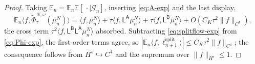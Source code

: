 \documentclass[a4paper,fleqn]{cas-sc}
\theoremstyle{definition}
\theoremstyle{remark}
\begin{document}
\begin{proof}
Taking $\mathbb E_n=\mathbb E_n\mathbb E[\,\cdot\mid\mathcal G_n]$, inserting \eqref{eq:A-exp}
and the last display,
\begin{equation}\label{eq:splitflow-exp}
\mathbb E_n\langle f,\widetilde\Phi^{N,\omega}_\tau(\mu^N_n)\rangle
=\langle f,\mu^N_n\rangle+\tau\langle f,\mathsf L^{\mathsf A}\mu^N_n\rangle
+\tau\langle f,\mathsf L^{\mathsf B}\mu^N_n\rangle+O(C_K\tau^2\|f\|_{C^4}),
\end{equation}
the cross term $\tau^2\langle f,\mathsf L^{\mathsf B}\mathsf L^{\mathsf A}\mu^N_n\rangle$
absorbed. Subtracting \eqref{eq:splitflow-exp} from \eqref{eq:Phi-exp}, the first-order
terms agree, so $|\mathbb E_n\langle f,\ell^{\mathrm{split}}_{n+1}\rangle|\le C_K\tau^2\|f\|_{C^4}$;
the consequence follows from $H^s\hookrightarrow C^4$ and the supremum over $\|f\|_{H^s}\le1$.
\end{proof}
\end{document}
